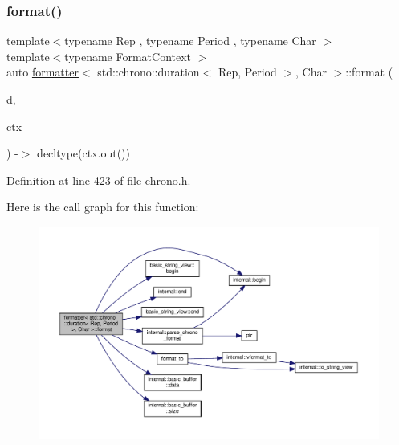 \subsubsection{\texorpdfstring{format()}{format()}}
{\footnotesize\ttfamily template$<$typename Rep , typename Period , typename Char $>$ \\
template$<$typename Format\+Context $>$ \\
auto \hyperlink{structformatter}{formatter}$<$ std\+::chrono\+::duration$<$ Rep, Period $>$, Char $>$\+::format (\begin{DoxyParamCaption}\item[{const duration \&}]{d,  }\item[{Format\+Context \&}]{ctx }\end{DoxyParamCaption}) -\/$>$ decltype(ctx.\+out()) \hspace{0.3cm}{\ttfamily [inline]}}



Definition at line 423 of file chrono.\+h.

Here is the call graph for this function\+:
\nopagebreak
\begin{figure}[H]
\begin{center}
\leavevmode
\includegraphics[width=350pt]{structformatter_3_01std_1_1chrono_1_1duration_3_01_rep_00_01_period_01_4_00_01_char_01_4_a8e85fb782f4dddcd3cb1fa207f2dd48c_cgraph}
\end{center}
\end{figure}
\mbox{\label{structformatter_3_01std_1_1chrono_1_1duration_3_01_rep_00_01_period_01_4_00_01_char_01_4_a0b4553a087ee08ec032965fe1fc35ff4}} 
